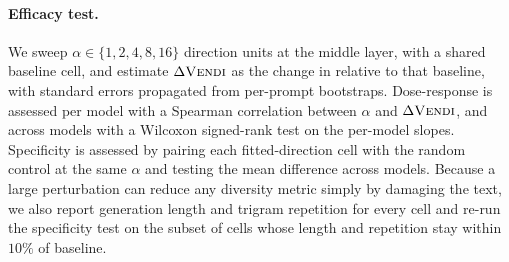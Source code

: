 \paragraph{Efficacy test.}
We sweep $\alpha \in \{1,2,4,8,16\}$ direction units at the middle layer, with a shared baseline
cell, and estimate $\Delta\textsc{Vendi}$ as the change in \vendi{} relative to that baseline, with standard errors
propagated from per-prompt bootstraps. Dose-response is assessed per model with a Spearman
correlation between $\alpha$ and $\Delta\textsc{Vendi}$, and across models with a Wilcoxon signed-rank test on the
per-model slopes. Specificity is assessed by pairing each fitted-direction cell with the random
control at the same $\alpha$ and testing the mean difference across models. Because a large
perturbation can reduce any diversity metric simply by damaging the text, we also report
generation length and trigram repetition for every cell and re-run the specificity test on the
subset of cells whose length and repetition stay within $10\%$ of baseline.
